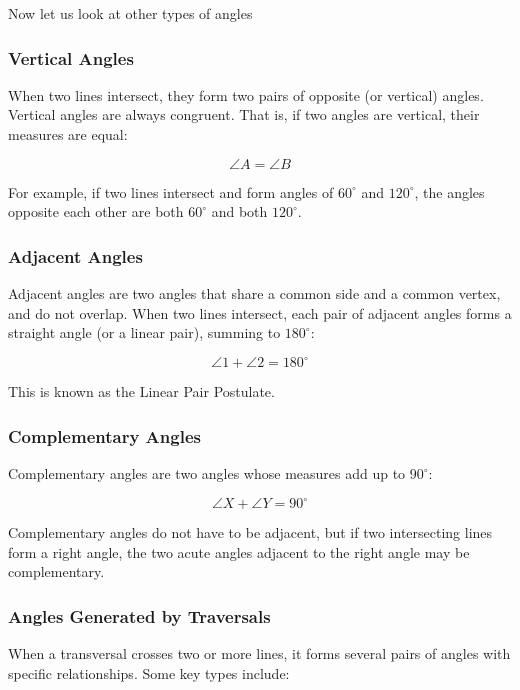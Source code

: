 Now let us look at other types of angles

\subsubsection{Vertical Angles}

When two lines intersect, they form two pairs of opposite (or vertical) angles. Vertical angles are 
always congruent. That is, if two angles are vertical, their measures are equal:

\[
	\angle A = \angle B
\]

For example, if two lines intersect and form angles of \( 60^\circ \) and \( 120^\circ \), the angles 
opposite each other are both \( 60^\circ \) and both \( 120^\circ \).

\subsubsection{Adjacent Angles}

Adjacent angles are two angles that share a common side and a common vertex, and do not overlap. When two 
lines intersect, each pair of adjacent angles forms a straight angle (or a linear pair), summing to 
\(180^\circ\):

\[
	\angle 1 + \angle 2 = 180^\circ
\]

This is known as the Linear Pair Postulate.

\subsubsection{Complementary Angles}

Complementary angles are two angles whose measures add up to \(90^\circ\):

\[
	\angle X + \angle Y = 90^\circ
\]

Complementary angles do not have to be adjacent, but if two intersecting lines form a right angle, the 
two acute angles adjacent to the right angle may be complementary.

\subsubsection{Angles Generated by Traversals}

When a transversal crosses two or more lines, it forms several pairs of angles with specific 
relationships. Some key types include:

